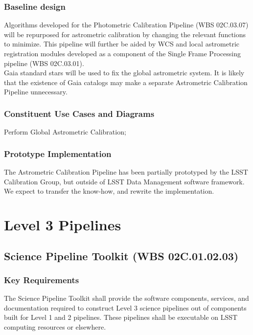 \documentclass[12pt]{article}
\newcommand{\wbsSFM}{WBS 02C.03.01}
\newcommand{\wbsSPT}{WBS 02C.01.02.03}
\newcommand{\wbsPhotoCal}{WBS 02C.03.07}
\begin{document}
\subsubsection{Baseline design}

Algorithms developed for the Photometric Calibration Pipeline (\wbsPhotoCal) will be repurposed for astrometric calibration by changing the relevant functions to minimize. This pipeline will further be aided by WCS and local astrometric registration modules developed as a component of the Single Frame Processing pipeline (\wbsSFM).
\\

Gaia standard stars will be used to fix the global astrometric system. It is likely that the existence of Gaia catalogs may make a separate Astrometric Calibration Pipeline unnecessary.

\subsubsection{Constituent Use Cases and Diagrams}

Perform Global Astrometric Calibration;

\subsubsection{Prototype Implementation}

The Astrometric Calibration Pipeline has been partially prototyped by the LSST Calibration Group, but outside of LSST Data Management software framework. We expect to transfer the know-how, and rewrite the implementation.

\clearpage

\section{Level 3 Pipelines}

\subsection{Science Pipeline Toolkit (\wbsSPT)}

\subsubsection{Key Requirements}

The Science Pipeline Toolkit shall provide the software components, services, and documentation required to construct Level 3 science pipelines out of components built for Level 1 and 2 pipelines. These pipelines shall be executable on LSST computing resources or elsewhere.
\end{document}
